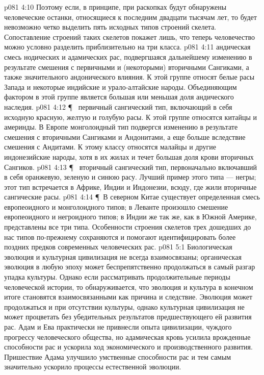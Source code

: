 \vs p081 4:10 Поэтому если, в принципе, при раскопках будут обнаружены человеческие останки, относящиеся к последним двадцати тысячам лет, то будет невозможно четко выделить пять исходных типов строений скелета. Сопоставление строений таких скелетов покажет лишь, что теперь человечество можно условно разделить приблизительно на три класса.
\vs p081 4:11 \bibnobreakspace {} андическая смесь нодических и адамических рас, подвергшаяся дальнейшему изменению в результате смешения с первичными и (некоторыми) вторичными Сангиками, а также значительного андонического влияния. К этой группе относят белые расы Запада и некоторые индийские и урало\hyp{}алтайские народы. Объединяющим фактором в этой группе является большая или меньшая доля андического наследия.
\vs p081 4:12 \P\ \bibnobreakspace {} первичный сангический тип, включающий в себя исходную красную, желтую и голубую расы. К этой группе относятся китайцы и америнды. В Европе монголоидный тип подвергся изменению в результате смешения с вторичными Сангиками и Андонитами, а еще больше вследствие смешения с Андитами. К этому классу относятся малайцы и другие индонезийские народы, хотя в их жилах и течет большая доля крови вторичных Сангиков.
\vs p081 4:13 \P\ \bibnobreakspace {} вторичный сангический тип, первоначально включавший в себя оранжевую, зеленую и синюю расу. Лучший пример этого типа --- негры; этот тип встречается в Африке, Индии и Индонезии, всюду, где жили вторичные сангические расы.
\vs p081 4:14 \P\ В северном Китае существует определенная смесь европеоидного и монголоидного типов; в Леванте произошло смешение европеоидного и негроидного типов; в Индии же так же, как в Южной Америке, представлены все три типа. Особенности строения скелетов трех дошедших до нас типов по\hyp{}прежнему сохраняются и помогают идентифицировать более поздних предков современных человеческих рас.
\vs p081 5:1 Биологическая эволюция и культурная цивилизация не всегда взаимосвязаны; органическая эволюция в любую эпоху может беспрепятственно продолжаться в самый разгар упадка культуры. Однако если рассматривать продолжительные периоды человеческой истории, то обнаруживается, что эволюция и культура в конечном итоге становятся взаимосвязанными как причина и следствие. Эволюция может продолжаться и при отсутствии культуры, однако культурная цивилизация не может процветать без убедительных результатов предшествующего ей развития рас. Адам и Ева практически не привнесли опыта цивилизации, чуждого прогрессу человеческого общества, но адамическая кровь усилила врожденные способности рас и ускорила ход экономического и производственного развития. Пришествие Адама улучшило умственные способности рас и тем самым значительно ускорило процессы естественной эволюции.
